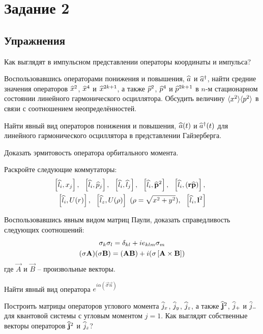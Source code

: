 \section{Задание 2}

\subsection*{\hfil Упражнения \hfil}
%
\begin{exercise}
\item\label{ex:1_2_1}%
Как выглядят в импульсном представлении операторы координаты и импульса?
%
\item\label{ex:1_2_2}%
Воспользовавшись операторами понижения и повышения, $\widehat{a}$ и $\widehat{a}^\dag$, найти средние значения операторов $\widehat{x}^2$, $\widehat{x}^4$ и $\widehat{x}^{2k+1}$, а также $\widehat{p}^2$, $\widehat{p}^4$ и $\widehat{p}^{2k+1}$ в $n$-м стационарном состоянии линейного гармонического осциллятора. Обсудить величину $\langle{x^2}\rangle\langle{p^2}\rangle$ в связи с соотношением неопределённостей.
%
\item\label{ex:1_2_3}%
Найти явный вид операторов понижения и повышения, $\widehat{a}(t)$ и $\widehat{a}^\dag(t)$ для линейного гармонического осциллятора в представлении Гайзерберга.
%
\item\label{ex:1_2_4}%
Доказать эрмитовость оператора орбитального момента.
%
\item\label{ex:1_2_5}%
Раскройте следующие коммутаторы:
$$
\begin{gathered}
\brs{\op{l}_i, x_j},~~ \brs{\op{l}_i, \op{p}_j},~~
\brs{\op{l}_i, \op{l}_j},~~ \brs{\op{l}_i, \op{\vp}^2},~~
\brs{\op{l}_i, (\vr \op{\vp})},~~ \\
%
\brs{\op{l}_i, U(r)},~~
\brs{\op{l}_z, U(\rho)}~ (\rho = \sqrt{x^2 + y^2}),~~ \brs{\op{l}_i, \vec{l}^2}
\end{gathered}
$$
%
\item\label{ex:1_2_6}%
Воспользовавшись явным видом матриц Паули, доказать справедливость следующих соотношений:
$$
\begin{gathered}
\sigma_k \sigma_l = \delta_{kl} + ie_{klm} \sigma_m \\
(\mathbf{\sigma} \mathbf{A}) (\mathbf{\sigma} \mathbf{B})
  = (\mathbf{A} \mathbf{B}) + i(\mathbf{\sigma} \left [ {\mathbf{A} \times \mathbf{B}} \right ])
\end{gathered}
$$%
%
где $\vec{A}$ и $\vec{B}$ -- произвольные векторы.
%
\item\label{ex:1_2_7}%
Найти явный вид оператора $e^{i\alpha(\vec{\sigma} \vec{n})}$
%
\item\label{ex:1_2_8}%
Построить матрицы операторов углового момента $\widehat{j}_x$, $\widehat{j}_y$, $\widehat{j}_z$, а также $\widehat{\mathbf{j}}^2$, $\widehat{j}_+$ и $\widehat{j}_-$ для квантовой системы с угловым моментом $j = 1$. Как выглядят собственные векторы операторов $\widehat{\mathbf{j}}^2$ и $\widehat{j}_z$?

\end{exercise}
